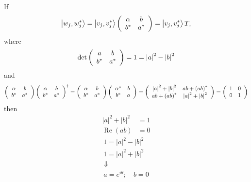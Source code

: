 \documentclass[aps,preprint]{revtex4}%
\begin{document}
If
\begin{equation}
\left\vert w_{j},w_{j}^{\ast}\right\rangle =\left\vert v_{j},v_{j}^{\ast
}\right\rangle \left(
\begin{array}
[c]{cc}%
\alpha & b\\
b^{\ast} & a^{\ast}%
\end{array}
\right)  =\left\vert v_{j},v_{j}^{\ast}\right\rangle T,
\end{equation}
where
\begin{equation}
\det\left(
\begin{array}
[c]{cc}%
a & b\\
b^{\ast} & a^{\ast}%
\end{array}
\right)  =1=\left\vert a\right\vert ^{2}-\left\vert b\right\vert ^{2}%
\end{equation}
and
\begin{equation}
\left(
\begin{array}
[c]{cc}%
\alpha & b\\
b^{\ast} & a^{\ast}%
\end{array}
\right)  \left(
\begin{array}
[c]{cc}%
\alpha & b\\
b^{\ast} & a^{\ast}%
\end{array}
\right)  ^{\dagger}=\left(
\begin{array}
[c]{cc}%
\alpha & b\\
b^{\ast} & a^{\ast}%
\end{array}
\right)  \left(
\begin{array}
[c]{cc}%
\alpha^{\ast} & b\\
b^{\ast} & a
\end{array}
\right)  =\left(
\begin{array}
[c]{cc}%
\left\vert a\right\vert ^{2}+\left\vert b\right\vert ^{2} & ab+\left(
ab\right)  ^{\ast}\\
ab+\left(  ab\right)  ^{\ast} & \left\vert a\right\vert ^{2}+\left\vert
b\right\vert ^{2}%
\end{array}
\right)  =\left(
\begin{array}
[c]{cc}%
1 & 0\\
0 & 1
\end{array}
\right)
\end{equation}
then%
\begin{align}
\left\vert a\right\vert ^{2}+\left\vert b\right\vert ^{2}  &  =1\\
\operatorname{Re}\left(  ab\right)   &  =0
\end{align}%
\begin{gather}
1=\left\vert a\right\vert ^{2}-\left\vert b\right\vert ^{2}\\
1=\left\vert a\right\vert ^{2}+\left\vert b\right\vert ^{2}\\
\Downarrow\\
a=e^{i\theta};\quad b=0
\end{gather}
\end{document}
